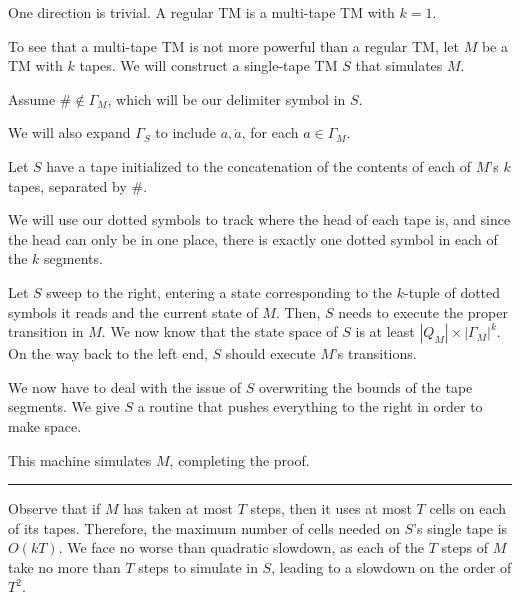 \documentclass[twoside]{article}
\newenvironment{proof}{{\bf Proof:}}{\hfill\rule{2mm}{2mm}}
\begin{document}


\begin{proof}
	
	One direction is trivial.  A regular TM is a multi-tape TM with $k=1$.
	
	To see that a multi-tape TM is not more powerful than a regular TM, let $M$ be a TM with $k$ tapes.  We will construct a single-tape TM $S$ that simulates $M$.
	
	Assume $\#\notin \Gamma_M$, which will be our delimiter symbol in $S$.
	
	We will also expand $\Gamma_S$ to include $a,\dot{a}$, for each $a\in\Gamma_M$.
	
	Let $S$ have a tape initialized to the concatenation of the contents of each of $M$'s $k$ tapes, separated by $\#$.
	
	We will use our dotted symbols to track where the head of each tape is, and since the head can only be in one place, there is exactly one dotted symbol in each of the $k$ segments.
	
	Let $S$ sweep to the right, entering a state corresponding to the $k$-tuple of dotted symbols it reads and the current state of $M$.  Then, $S$ needs to execute the proper transition in $M$.  We now know that the state space of $S$ is at least $|Q_M|\times |\Gamma_M|^k$.  On the way back to the left end, $S$ should execute $M$'s transitions.
	
	We now have to deal with the issue of $S$ overwriting the bounds of the tape segments.  We give $S$ a routine that pushes everything to the right in order to make space.
	
	This machine simulates $M$, completing the proof.
	
	
	
\end{proof}

Observe that if $M$ has taken at most $T$ steps, then it uses at most $T$ cells on each of its tapes.  Therefore, the maximum number of cells needed on $S$'s single tape is $O(kT)$.  We face no worse than quadratic slowdown, as each of the $T$ steps of $M$ take no more than $T$ steps to simulate in $S$, leading to a slowdown on the order of $T^2$.  
\end{document}
